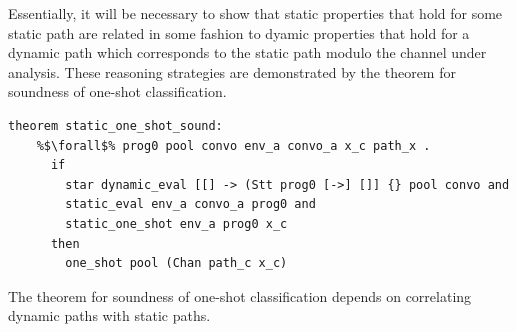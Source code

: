 \documentclass{article}
\begin{document}
Essentially, it will be necessary to show that static
properties that hold for some static path are related in some fashion to dyamic properties
that hold for a dynamic path which corresponds to the static path modulo the channel under
analysis. These reasoning strategies are demonstrated by the theorem for soundness of
one-shot classification.


\begin{lstlisting}[language=logic, escapechar=\%]
  theorem static_one_shot_sound:
    %$\forall$% prog0 pool convo env_a convo_a x_c path_x . 
      if
        star dynamic_eval [[] -> (Stt prog0 [->] []] {} pool convo and
        static_eval env_a convo_a prog0 and
        static_one_shot env_a prog0 x_c
      then 
        one_shot pool (Chan path_c x_c)
  \end{lstlisting}

The theorem for soundness of one-shot classification depends on
correlating dynamic paths with static paths.
\end{document}
